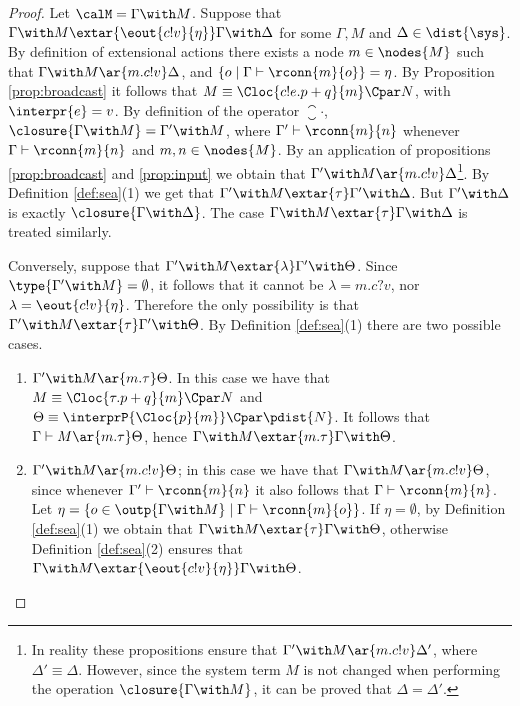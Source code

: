\documentclass{LMCS}
\begin{document}
\begin{proof}
Let $\calM = \Gamma \with M$. 
Suppose that $\Gamma \with M \extar{\eout{c!v}{\eta}} \Gamma \with \Delta$ 
for some $\Gamma, M$ and $\Delta \in \dist{\sys}$. 
By definition of extensional actions there exists a node $m \in \nodes{M}$ 
such that $\Gamma \with M \ar{m.c!v} \Delta$, and 
$\{o\;|\; \Gamma \vdash \rconn{m}{o}\} = \eta$. 
By Proposition \ref{prop:broadcast} it follows that 
$M \equiv \Cloc{c!e.p + q}{m} \Cpar N$, with $\interpr{e} = v$. 
By definition of the operator $\closure{\cdot}$, 
$\closure{\Gamma \with M} = \Gamma' \with M$, where 
 $\Gamma' \vdash \rconn{m}{n}$ whenever 
$\Gamma \vdash \rconn{m}{n}$ and $m,n \in \nodes{M}$.
By an application of propositions \ref{prop:broadcast} and 
\ref{prop:input} we obtain that $\Gamma' \with M 
\ar{m.c!v} \Delta$\footnote{In reality these propositions ensure that 
$\Gamma' \with M \ar{m.c!v} \Delta'$, where $\Delta' \equiv \Delta$. 
However, since the system term $M$ is not changed when performing 
the operation $\closure{\Gamma \with M}$, 
it can be proved that $\Delta = \Delta'$.}. By 
Definition \ref{def:sea}(1) we get 
that $\Gamma' \with M \extar{\tau} \Gamma' \with \Delta$. 
But $\Gamma' \with \Delta$ is exactly $\closure{\Gamma \with \Delta}$.
The case $\Gamma \with M \extar{\tau} \Gamma \with \Delta$ is 
treated similarly.

Conversely, suppose that $\Gamma' \with M \extar{\lambda}  
\Gamma' \with \Theta$. Since $\type{\Gamma' \with M} = \emptyset$, 
it follows that it cannot be $\lambda = m.c?v$, nor $\lambda = \eout{c!v}{\eta}$. 
Therefore the only possibility is that $\Gamma' \with M 
\extar{\tau} \Gamma' \with \Theta$. By Definition 
\ref{def:sea}(1) there are two possible cases. 

\begin{enumerate}
\item $\Gamma' \with M \ar{m.\tau} \Theta$. In this 
case we have that $M \equiv \Cloc{\tau.p + q}{m} \Cpar N$ 
and $\Theta \equiv \interprP{\Cloc{p}{m}} \Cpar \pdist{N}$. 
It follows that $\Gamma \vdash M \ar{m.\tau} \Theta$, 
hence $\Gamma \with M \extar{m.\tau} \Gamma \with \Theta$.

\item $\Gamma' \with M \ar{m.c!v} \Theta$; in this 
case we have that $\Gamma \with M \ar{m.c!v} \Theta$, 
since whenever $\Gamma' \vdash \rconn{m}{n}$ it also 
follows that $\Gamma \vdash \rconn{m}{n}$. Let 
$\eta = \{o \in \outp{\Gamma \with M}\;|\; \Gamma \vdash \rconn{m}{o}\}$. 
If $\eta = \emptyset$, by Definition \ref{def:sea}(1) 
we obtain that $\Gamma \with M \extar{\tau} \Gamma \with \Theta$, 
otherwise Definition \ref{def:sea}(2) ensures that 
$\Gamma \with M \extar{\eout{c!v}{\eta}} \Gamma \with \Theta$.\qedhere
\end{enumerate}

\end{proof}
\end{document}
